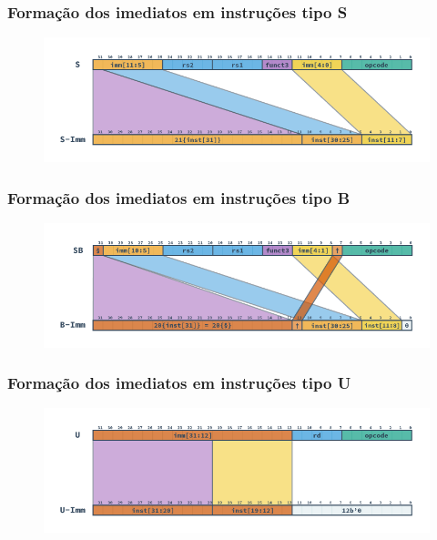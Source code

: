 \documentclass[aspectratio=169]{beamer}
\begin{document}
    \begin{frame}
        \frametitle{Formação dos imediatos em instruções tipo \textbf{S}}
        \vfill
        \begin{figure}[H]
        \centering
            \includegraphics[width=.9\textwidth,height=.9\textheight,keepaspectratio]{../images/RV_S_Imm.png}
        \end{figure}
        \vfill
    \end{frame}

    \begin{frame}
        \frametitle{Formação dos imediatos em instruções tipo \textbf{B}}
        \vfill
        \begin{figure}[H]
        \centering
            \includegraphics[width=.9\textwidth,height=.9\textheight,keepaspectratio]{../images/RV_B_Imm.png}
        \end{figure}
        \vfill
    \end{frame}

    \begin{frame}
        \frametitle{Formação dos imediatos em instruções tipo \textbf{U}}
        \vfill
        \begin{figure}[H]
        \centering
            \includegraphics[width=.9\textwidth,height=.9\textheight,keepaspectratio]{../images/RV_U_Imm.png}
        \end{figure}
        \vfill
    \end{frame}
\end{document}
